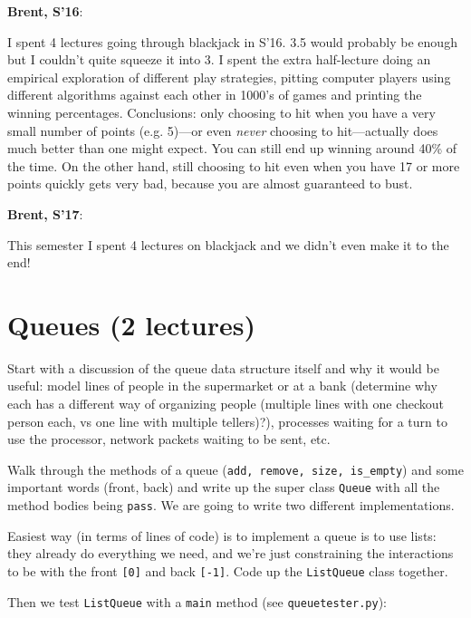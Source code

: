 \documentclass{article}
\newenvironment{reflect}[1]
{
  \noindent
  \begin{lrbox}{\reflectbox}
    \begin{minipage}[t]{\textwidth}
      \textbf{#1}:
}{
    \end{minipage}
  \end{lrbox}
  \fbox{\usebox{\reflectbox}}
}
\begin{document}
\begin{reflect}{Brent, S'16}
  I spent 4 lectures going through blackjack in S'16.  3.5 would
  probably be enough but I couldn't quite squeeze it into 3.  I spent
  the extra half-lecture doing an empirical exploration of different
  play strategies, pitting computer players using different algorithms
  against each other in 1000's of games and printing the winning
  percentages.  Conclusions: only choosing to hit when you have a very
  small number of points (e.g. 5)---or even \emph{never} choosing to
  hit---actually does much better than one might expect.  You can
  still end up winning around 40\% of the time.  On the other hand,
  still choosing to hit even when you have 17 or more points quickly
  gets very bad, because you are almost guaranteed to bust.
\end{reflect}

\begin{reflect}{Brent, S'17}
  This semester I spent 4 lectures on blackjack and we didn't even
  make it to the end!
\end{reflect}

\newpage
\section{Queues (2 lectures)}

Start with a discussion of the queue data structure itself and why it
would be useful: model lines of people in the supermarket or at a bank
(determine why each has a different way of organizing people (multiple
lines with one checkout person each, vs one line with multiple
tellers)?), processes waiting for a turn to use the processor, network
packets waiting to be sent, etc.

Walk through the methods of a queue
(\verb|add, remove, size, is_empty|) and some important words (front,
back) and write up the super class \verb|Queue| with all the method bodies
being \verb|pass|.  We are going to write two different implementations.

Easiest way (in terms of lines of code) is to implement a queue is to
use lists: they already do everything we need, and we're just
constraining the interactions to be with the front \verb|[0]| and back
\verb|[-1]|. Code up the \verb|ListQueue| class together.

Then we test \verb|ListQueue| with a \verb|main| method (see
\verb|queuetester.py|):
\end{document}
